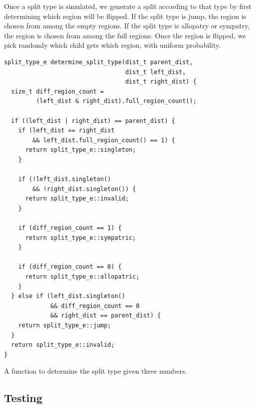 \documentclass{article}
\begin{document}

Once a split type is simulated, we generate
a split according to that type by first determining which region will be
flipped\footnotemark.
If the split type is jump, the region is chosen from among the empty regions.
If the split type is allopatry or sympatry, the region is chosen from among the
full regions.
Once the region is flipped, we pick randomly which child gets which region,
with uniform probability.


\begin{listing}
	\begin{verbatim}
split_type_e determine_split_type(dist_t parent_dist, 
                                  dist_t left_dist, 
                                  dist_t right_dist) {
  size_t diff_region_count =
         (left_dist & right_dist).full_region_count();

  if ((left_dist | right_dist) == parent_dist) {
    if (left_dist == right_dist 
        && left_dist.full_region_count() == 1) {
      return split_type_e::singleton;
    }

    if (!left_dist.singleton() 
        && !right_dist.singleton()) {
      return split_type_e::invalid;
    }

    if (diff_region_count == 1) {
      return split_type_e::sympatric;
    }

    if (diff_region_count == 0) {
      return split_type_e::allopatric;
    }
  } else if (left_dist.singleton()
             && diff_region_count == 0
             && right_dist == parent_dist) {
    return split_type_e::jump;
  }
  return split_type_e::invalid;
}
\end{verbatim}
	\caption{A function to determine the split type given three numbers.}
	\label{lst:determine-split-type}
\end{listing}

\subsection{Testing}
\end{document}
